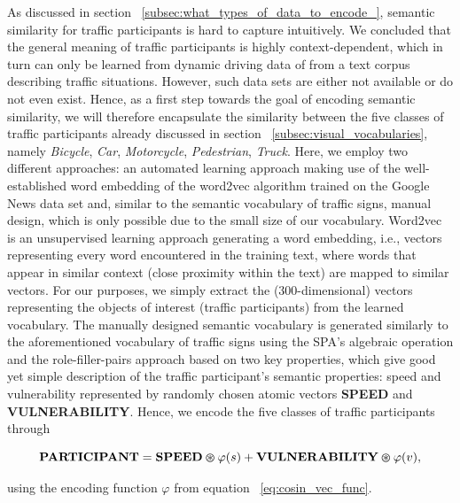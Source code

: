 As discussed in section ~\ref{subsec:what_types_of_data_to_encode_}, semantic similarity for traffic participants is hard to capture intuitively.
We concluded that the general meaning of traffic participants is highly context-dependent, which in turn can only be learned from dynamic driving data of from a text corpus describing traffic situations.
However, such data sets are either not available or do not even exist.
Hence, as a first step towards the goal of encoding semantic similarity, we will therefore encapsulate the similarity between the five classes of traffic participants already discussed in section ~\ref{subsec:visual_vocabularies}, namely \emph{Bicycle}, \emph{Car}, \emph{Motorcycle}, \emph{Pedestrian}, \emph{Truck}.
Here, we employ two different approaches: an automated learning approach making use of the well-established word embedding of the word2vec algorithm \cite{Mikolov2013} trained on the Google News data set and, similar to the semantic vocabulary of traffic signs, manual design, which is only possible due to the small size of our vocabulary.
Word2vec is an unsupervised learning approach generating a word embedding, i.e., vectors representing every word encountered in the training text, where words that appear in similar context (close proximity within the text) are mapped to similar vectors. 
For our purposes, we simply extract the (\num{300}-dimensional) vectors representing the objects of interest (traffic participants) from the learned vocabulary.
The manually designed semantic vocabulary is generated similarly to the aforementioned vocabulary of traffic signs using the \ac{SPA}'s algebraic operation and the role-filler-pairs approach based on two key properties, which give good yet simple description of the traffic participant's semantic properties: speed and vulnerability represented by randomly chosen atomic vectors \textbf{SPEED} and \textbf{VULNERABILITY}.
Hence, we encode the five classes of traffic participants through

\begin{equation}
\label{eq:semantic_vocab_traffic_participants}
\mathbf{PARTICIPANT} = \mathbf{SPEED} \varoast \varphi(s) + \mathbf{VULNERABILITY} \varoast \varphi(v),
\end{equation}

using the encoding function $\varphi$ from equation ~\ref{eq:cosin_vec_func}.

